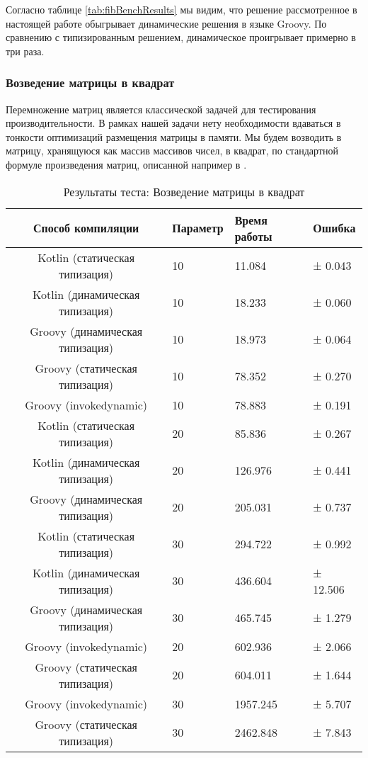 Согласно таблице \ref{tab:fibBenchResults} мы видим, что решение рассмотренное в настоящей работе обыгрывает динамические решения в языке Groovy. По сравнению с типизированным решением, динамическое проигрывает примерно в три раза.


\subsubsection{Возведение матрицы в квадрат}

Перемножение матриц является классической задачей для тестирования производительности. В рамках нашей задачи нету необходимости вдаваться в тонкости оптимизаций размещения матрицы в памяти. Мы будем возводить в матрицу, хранящуюся как массив массивов чисел, в квадрат, по стандартной формуле произведения матриц, описанной например в \cite{book:KryakvinVadimDLinAlgebra}. 

\begin{table}[h]
\caption{\label{tab:matrixSquareBenchResults}Результаты теста: Возведение матрицы в квадрат}
\begin{center}
\begin{tabular}{|c|l|l|l|}
\hline
Способ компиляции & Параметр	& Время работы & Ошибка \\
\hline
Kotlin (статическая типизация)   &   10 &    11.084 & ±  0.043\\
Kotlin (динамическая типизация)  &   10 &    18.233 & ±  0.060\\
Groovy (динамическая типизация)  &   10 &    18.973 & ±  0.064\\
Groovy (статическая типизация)   &   10 &    78.352 & ±  0.270\\
Groovy (invokedynamic)           &   10 &    78.883 & ±  0.191\\
Kotlin (статическая типизация)   &   20 &    85.836 & ±  0.267\\
Kotlin (динамическая типизация)  &   20 &   126.976 & ±  0.441\\
Groovy (динамическая типизация)  &   20 &   205.031 & ±  0.737\\
Kotlin (статическая типизация)   &   30 &   294.722 & ±  0.992\\
Kotlin (динамическая типизация)  &   30 &   436.604 & ± 12.506\\
Groovy (динамическая типизация)  &   30 &   465.745 & ±  1.279\\
Groovy (invokedynamic)           &   20 &   602.936 & ±  2.066\\
Groovy (статическая типизация)   &   20 &   604.011 & ±  1.644\\
Groovy (invokedynamic)           &   30 &  1957.245 & ±  5.707\\
Groovy (статическая типизация)   &   30 &  2462.848 & ±  7.843\\
\hline
\end{tabular}
\end{center}
\end{table} 



